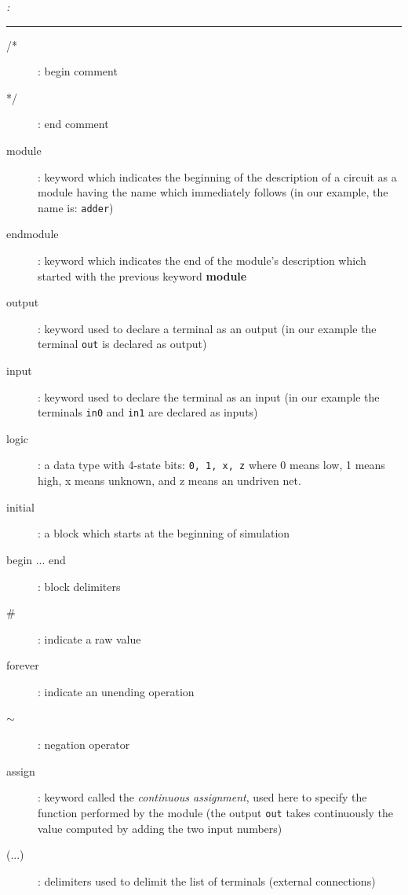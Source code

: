 \begin{verisum}{\em :

\hspace{-0.8cm} \rule[5mm]{16cm}{0.25mm} \vspace{-0.7cm}

\begin{description}
\item[/*]: begin comment
\item[*/]: end comment
\item[module]: keyword which indicates the beginning of the
description of a circuit as a module having the name which
immediately follows (in our example, the name is: {\tt adder})

\item[endmodule]: keyword which indicates the end of the module's
description which started with the previous keyword {\bf module}

\item[output]: keyword used to declare a terminal as an output (in
our example the terminal {\tt out} is declared as output)

\item[input]: keyword used to declare the terminal as an input (in
our example the terminals {\tt in0} and {\tt in1} are declared as
inputs)

\item[logic]: a data type with 4-state bits: {\tt 0, 1, x, z} where 0 means low, 1 means high, x means unknown, and z means an undriven net.

\item[initial]: a block which starts at the beginning of simulation

\item[begin ... end]: block delimiters

\item[\#]: indicate a raw value

\item[forever]: indicate an unending operation

\item[$\sim$]: negation operator

\item[assign]: keyword called the {\em continuous assignment},
used here to specify the function performed by the module (the
output {\tt out} takes continuously the value computed by adding
the two input numbers)

\item[(...)]: delimiters used to delimit the list of terminals
(external connections)


\end{description}}
\end{verisum}

